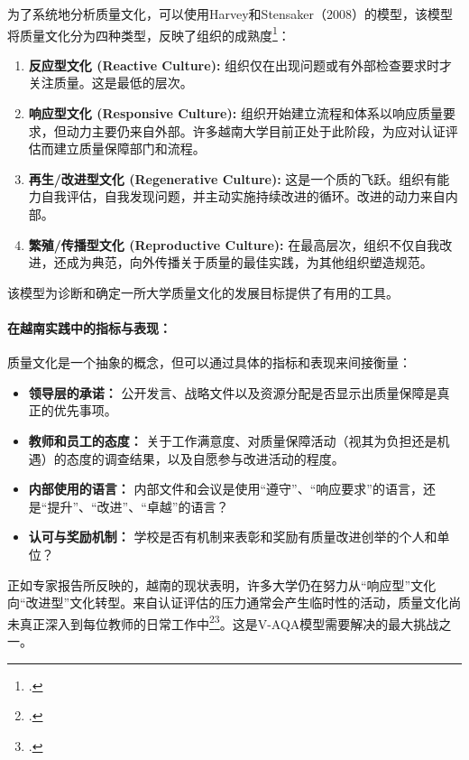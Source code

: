 为了系统地分析质量文化，可以使用Harvey和Stensaker（2008）的模型，该模型将质量文化分为四种类型，反映了组织的成熟度\footcite{HarveyStensaker}：
\begin{enumerate}
    \item \textbf{反应型文化 (Reactive Culture):} 组织仅在出现问题或有外部检查要求时才关注质量。这是最低的层次。
    \item \textbf{响应型文化 (Responsive Culture):} 组织开始建立流程和体系以响应质量要求，但动力主要仍来自外部。许多越南大学目前正处于此阶段，为应对认证评估而建立质量保障部门和流程。
    \item \textbf{再生/改进型文化 (Regenerative Culture):} 这是一个质的飞跃。组织有能力自我评估，自我发现问题，并主动实施持续改进的循环。改进的动力来自内部。
    \item \textbf{繁殖/传播型文化 (Reproductive Culture):} 在最高层次，组织不仅自我改进，还成为典范，向外传播关于质量的最佳实践，为其他组织塑造规范。
\end{enumerate}
该模型为诊断和确定一所大学质量文化的发展目标提供了有用的工具。

\paragraph{在越南实践中的指标与表现：}
质量文化是一个抽象的概念，但可以通过具体的指标和表现来间接衡量：
\begin{itemize}
    \item \textbf{领导层的承诺：} 公开发言、战略文件以及资源分配是否显示出质量保障是真正的优先事项。
    \item \textbf{教师和员工的态度：} 关于工作满意度、对质量保障活动（视其为负担还是机遇）的态度的调查结果，以及自愿参与改进活动的程度。
    \item \textbf{内部使用的语言：} 内部文件和会议是使用“遵守”、“响应要求”的语言，还是“提升”、“改进”、“卓越”的语言？
    \item \textbf{认可与奖励机制：} 学校是否有机制来表彰和奖励有质量改进创举的个人和单位？
\end{itemize}
正如专家报告所反映的，越南的现状表明，许多大学仍在努力从“响应型”文化向“改进型”文化转型。来自认证评估的压力通常会产生临时性的活动，质量文化尚未真正深入到每位教师的日常工作中\footcite{ExpertPerspectivesVN}\footcite{CommonFailureCriteria}。这是V-AQA模型需要解决的最大挑战之一。



